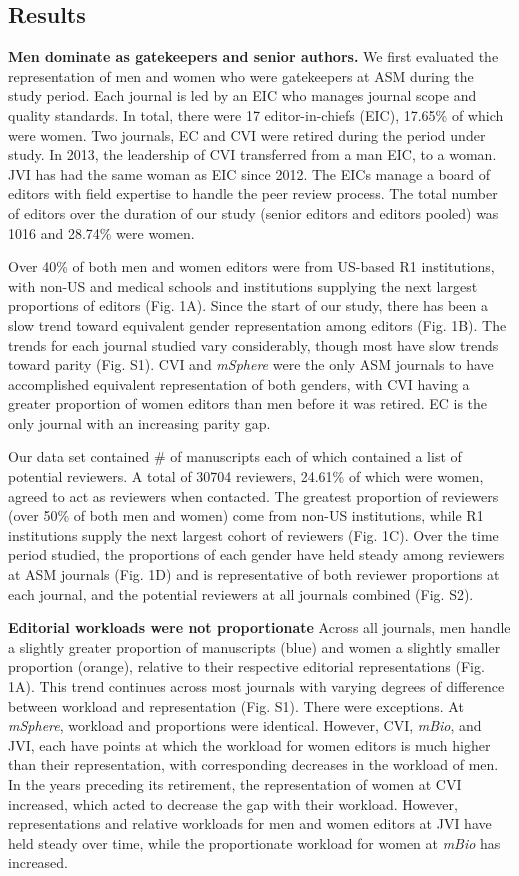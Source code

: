 \documentclass[11pt,]{article}
\begin{document}
\subsection{Results}\label{results}

\textbf{Men dominate as gatekeepers and senior authors.} We first
evaluated the representation of men and women who were gatekeepers at
ASM during the study period. Each journal is led by an EIC who manages
journal scope and quality standards. In total, there were 17
editor-in-chiefs (EIC), 17.65\% of which were women. Two journals, EC
and CVI were retired during the period under study. In 2013, the
leadership of CVI transferred from a man EIC, to a woman. JVI has had
the same woman as EIC since 2012. The EICs manage a board of editors
with field expertise to handle the peer review process. The total number
of editors over the duration of our study (senior editors and editors
pooled) was 1016 and 28.74\% were women.

Over 40\% of both men and women editors were from US-based R1
institutions, with non-US and medical schools and institutions supplying
the next largest proportions of editors (Fig. 1A). Since the start of
our study, there has been a slow trend toward equivalent gender
representation among editors (Fig. 1B). The trends for each journal
studied vary considerably, though most have slow trends toward parity
(Fig. S1). CVI and \emph{mSphere} were the only ASM journals to have
accomplished equivalent representation of both genders, with CVI having
a greater proportion of women editors than men before it was retired. EC
is the only journal with an increasing parity gap.

Our data set contained \# of manuscripts each of which contained a list
of potential reviewers. A total of 30704 reviewers, 24.61\% of which
were women, agreed to act as reviewers when contacted. The greatest
proportion of reviewers (over 50\% of both men and women) come from
non-US institutions, while R1 institutions supply the next largest
cohort of reviewers (Fig. 1C). Over the time period studied, the
proportions of each gender have held steady among reviewers at ASM
journals (Fig. 1D) and is representative of both reviewer proportions at
each journal, and the potential reviewers at all journals combined (Fig.
S2).

\textbf{Editorial workloads were not proportionate} Across all journals,
men handle a slightly greater proportion of manuscripts (blue) and women
a slightly smaller proportion (orange), relative to their respective
editorial representations (Fig. 1A). This trend continues across most
journals with varying degrees of difference between workload and
representation (Fig. S1). There were exceptions. At \emph{mSphere},
workload and proportions were identical. However, CVI, \emph{mBio}, and
JVI, each have points at which the workload for women editors is much
higher than their representation, with corresponding decreases in the
workload of men. In the years preceding its retirement, the
representation of women at CVI increased, which acted to decrease the
gap with their workload. However, representations and relative workloads
for men and women editors at JVI have held steady over time, while the
proportionate workload for women at \emph{mBio} has increased.
\end{document}
